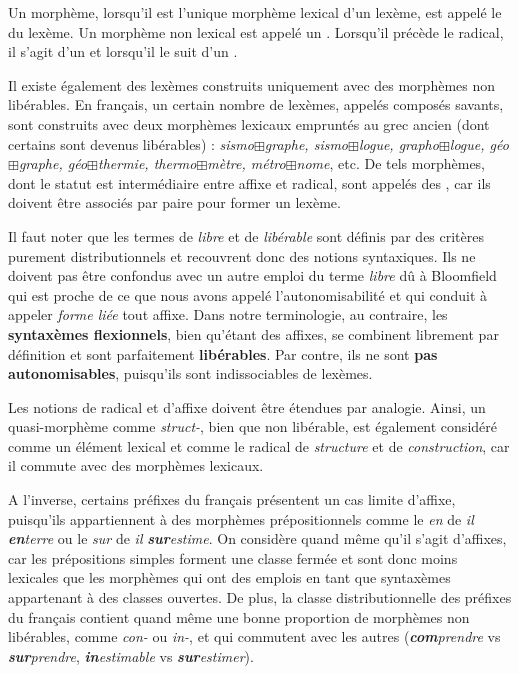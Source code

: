 \begin{styleLivreImportant}
Un morphème, lorsqu’il est l’unique morphème lexical d’un lexème, est appelé le  du lexème. Un morphème non lexical est appelé un . Lorsqu’il précède le radical, il s’agit d’un  et lorsqu’il le suit d’un .
\end{styleLivreImportant}

Il existe également des lexèmes construits uniquement avec des morphèmes non libérables. En français, un certain nombre de lexèmes, appelés composés savants, sont construits avec deux morphèmes lexicaux empruntés au grec ancien (dont certains sont devenus libérables) : \textit{sismo}${\boxplus}$\textit{graphe, sismo}${\boxplus}$\textit{logue, grapho}${\boxplus}$\textit{logue, géo}${\boxplus}$\textit{graphe, géo}${\boxplus}$\textit{thermie, thermo}${\boxplus}$\textit{mètre, métro}${\boxplus}$\textit{nome}, etc. De tels morphèmes, dont le statut est intermédiaire entre affixe et radical, sont appelés des , car ils doivent être associés par paire pour former un lexème.

Il faut noter que les termes de \textit{libre} et de \textit{libérable} sont définis par des critères purement distributionnels et recouvrent donc des notions syntaxiques. Ils ne doivent pas être confondus avec un autre emploi du terme \textit{libre} dû à Bloomfield qui est proche de ce que nous avons appelé l’autonomisabilité et qui conduit à appeler \textit{forme liée} tout affixe. Dans notre terminologie, au contraire, les \textbf{syntaxèmes flexionnels}, bien qu’étant des affixes, se combinent librement par définition et sont parfaitement \textbf{libérables}. Par contre, ils ne sont \textbf{pas autonomisables}, puisqu’ils sont indissociables de lexèmes.

Les notions de radical et d’affixe doivent être étendues par analogie. Ainsi, un quasi-morphème comme \textit{struct-}, bien que non libérable, est également considéré comme un élément lexical et comme le radical de \textit{structure} et de \textit{construction}, car il commute avec des morphèmes lexicaux.

A l’inverse, certains préfixes du français présentent un cas limite d’affixe, puisqu’ils appartiennent à des morphèmes prépositionnels comme le \textit{en} de \textit{il} \textbf{\textit{en}}\textit{terre} ou le \textit{sur} de \textit{il} \textbf{\textit{sur}}\textit{estime}. On considère quand même qu’il s’agit d’affixes, car les prépositions simples forment une classe fermée et sont donc moins lexicales que les morphèmes qui ont des emplois en tant que syntaxèmes appartenant à des classes ouvertes. De plus, la classe distributionnelle des préfixes du français contient quand même une bonne proportion de morphèmes non libérables, comme \textit{con-} ou \textit{in-}, et qui commutent avec les autres (\textbf{\textit{com}}\textit{prendre} vs \textbf{\textit{sur}}\textit{prendre}, \textbf{\textit{in}}\textit{estimable} vs \textbf{\textit{sur}}\textit{estimer}).

